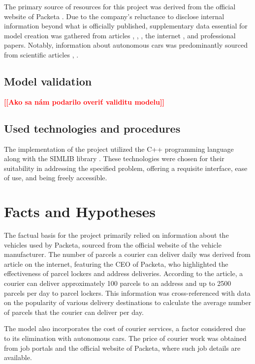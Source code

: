 \documentclass[a4paper, 11pt, a4paper]{article}
\newcommand{\todo}[1]{\textcolor{red}{\textbf{[[#1]]}}}
\begin{document}
The primary source of resources for this project was derived from the official website of Packeta \cite{packeta}. 
Due to the company's reluctance to disclose internal information beyond what is officially published, 
supplementary data essential for model creation was gathered from articles \cite{delivery.distance}, \cite{delivery.percentage}, 
\cite{parcels.num}, the internet \cite{peugeot}, and professional papers. 
Notably, information about autonomous cars was predominantly sourced from scientific articles \cite{autonomous.emissions}, \cite{autonomous.models}.


\subsection{Model validation}

\noindent\todo{Ako sa nám podarilo overiť validitu modelu}


\subsection{Used technologies and procedures}

The implementation of the project utilized the C++ programming language along with the SIMLIB library \cite{SIMLIB}. 
These technologies were chosen for their suitability in addressing the specified problem, offering a requisite interface, 
ease of use, and being freely accessible.


\section{Facts and Hypotheses}

The factual basis for the project primarily relied on information about the vehicles used by Packeta, sourced from the official 
website of the vehicle manufacturer. The number of parcels a courier can deliver daily was derived from article \cite{parcels.num} on the internet, 
featuring the CEO of Packeta, who highlighted the effectiveness of parcel lockers and address deliveries. According to the article, 
a courier can deliver approximately 100 parcels to an address and up to 2500 parcels per day to parcel lockers. This information was 
cross-referenced with data on the popularity of various delivery destinations \cite{delivery.percentage} to calculate the average number of 
parcels that the courier can deliver per day.

The model also incorporates the cost of courier services, a factor considered due to its elimination with autonomous cars. 
The price of courier work was obtained from job portals and the official website of Packeta, where such job details are available.
\end{document}

